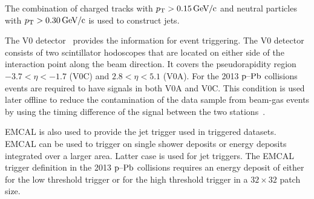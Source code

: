 The combination of charged tracks with  $\pt{} > \unit[0.15]{\GeVc}$ and neutral particles with $\pt{} > \unit[0.30]{\GeVc}$ is used to construct jets. 

The V0 detector~\cite{forwarddetectorsTdr} provides the information for event triggering. The V0 detector consists of two scintillator hodoscopes that are located on either side of the interaction point along the beam direction. It covers the pseudorapidity region $-3.7 < \eta < -1.7$ (V0C) and $2.8 < \eta < 5.1$ (V0A). For the 2013 $\mbox{p--Pb}$ collisions events are required to have signals in both V0A and V0C. This condition is used later offline to reduce the contamination of the data sample from beam-gas events by using the timing difference of the signal between the two stations~\cite{alicePerformance}.


EMCAL is also used to provide the jet trigger used in triggered datasets. EMCAL can be used to trigger on single shower deposits or energy deposits integrated over a larger area. Latter case is used for jet triggers. The EMCAL trigger definition in the 2013 $\mbox{p--Pb}$ collisions requires an energy deposit of either \unit[10]{\gev}  for the low threshold trigger or \unit[20]{\gev} for the high threshold trigger in a $32\times32$ patch size.


